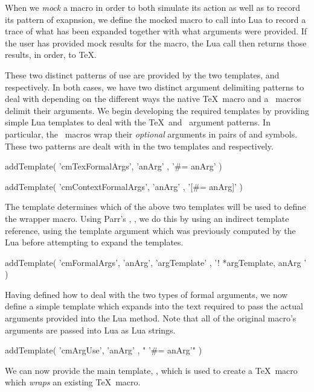 When we \emph{mock} a macro in order to both simulate its action as well 
as to record its pattern of exapnsion, we define the mocked macro to call 
into Lua to record a trace of what has been expanded together with what 
arguments were provided. If the user has provided mock results for the 
macro, the Lua call then returns those results, in order, to \TeX. 

These two distinct patterns of use are provided by the two templates, 
 and  respectively. In both cases, we have two 
distinct argument delimiting patterns to deal with depending on the 
different ways the  native \TeX\ macro and a 
 \ConTeXt\ macros delimit their arguments. We begin 
developing the required templates by providing simple Lua templates to 
deal with the \TeX\ and \ConTeXt\ argument patterns. In particular, the 
 \ConTeXt\ macros wrap their \emph{optional} arguments in 
pairs of \quote{[} and \quote{]} symbols. These two patterns are dealt 
with in the two templates  and 
 respectively. 

\startLuaTemplate
addTemplate(
  'cmTexFormalArgs',
  { 'anArg' },
  '#{{= anArg}}'
)

addTemplate(
  'cmContextFormalArgs',
  { 'anArg' },
  '[#{{= anArg}}]'
)
\stopLuaTemplate

The  template determines which of the above two 
templates will be used to define the wrapper macro. Using Parr's 
, \cite{parr2004templateMVC}, we do this by using an 
indirect template reference, using the template argument 
 which was previously computed by the Lua 
 before attempting to expand the templates. 

\startLuaTemplate
addTemplate(
  'cmFormalArgs',
  { 'anArg', 'argTemplate' },
  '{{! *argTemplate, anArg }}'
)
\stopLuaTemplate

Having defined how to deal with the two types of formal arguments, we now 
define a simple template  which expands into the text 
required to pass the actual arguments provided into the Lua 
 method. Note that all of the original macro's 
arguments are passed into Lua as Lua strings. 

\startLuaTemplate
addTemplate(
  'cmArgUse',
  { 'anArg' },
  "        '#{{= anArg}}'"
)
\stopLuaTemplate

We can now provide the main template, , which is used to 
create a \TeX\ macro which \emph{wraps} an existing \TeX\ macro. 

